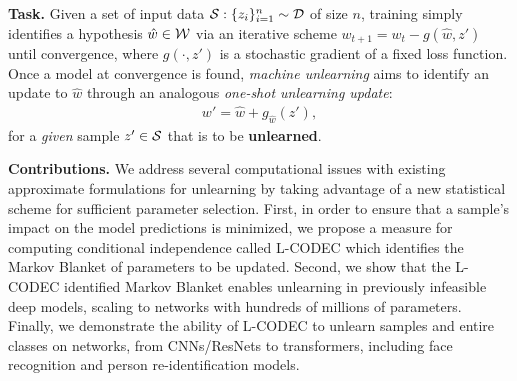 {\bf Task.} Given a set of input data $\mathcal{S}: \{z_i\}_{i=1}^n \sim \mathcal{D}$ of size $n$, training simply identifies a hypothesis $\hat{w} \in \mathcal{W}$  via an iterative scheme $w_{t+1} = w_t - g(\hat{w},z')$ until convergence, where $g(\cdot,z')$ is  a stochastic gradient of a fixed loss function. Once a model at convergence is found, \textit{machine unlearning} aims to identify an update to $\hat{w}$ through an analogous {\em one-shot unlearning update}:
\begin{align}\label{eq:unlearn}
    w' = \hat{w} + g_{\hat{w}}\left(z'\right),
\end{align}
for a {\em given} sample $z' \in \mathcal{S}$ that is to be {\bf unlearned}.

\noindent\textbf{Contributions.} We address several computational issues with existing approximate formulations for unlearning by taking advantage of a new statistical scheme for sufficient parameter selection. 
First, in order to ensure that a sample's impact on the model predictions is minimized, we propose a measure for computing conditional independence called L-CODEC which  identifies the Markov Blanket of parameters to be  updated. 
Second, we show that the L-CODEC identified Markov Blanket enables unlearning in previously infeasible deep models, scaling to networks with hundreds of millions of parameters. 
Finally, we demonstrate the ability of L-CODEC to unlearn samples and entire classes on networks, from CNNs/ResNets to transformers, including face recognition and person re-identification models.